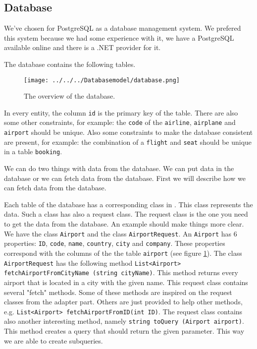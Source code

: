 
\subsection{Database}
We've chosen for PostgreSQL as a database management system. We prefered this system because we had some experience with it, we have a PostgreSQL available online and there is a .NET provider for it.

The database contains the following tables.
\begin{figure}[H]
	\centering
	\texttt{[image: ../../../Databasemodel/database.png]}
	\caption{The overview of the database.}
	\label{fig:database_design}
\end{figure}
In every entity, the column \texttt{id} is the primary key of the table. There are also some other constraints, for example: the \texttt{code} of the \texttt{airline}, \texttt{airplane} and \texttt{airport} should be unique. Also some constraints to make the database consistent are present, for example: the combination of a \texttt{flight} and \texttt{seat} should be unique in a table \texttt{booking}. 

We can do two things with data from the database. We can put data in the database or we can fetch data from the database. First we will describe how we can fetch data from the database.

Each table of the database has a corresponding class in \Csh. This class represents the  data. Such a class has also a request class. The request class is the one you need to get the data from the database. An example should make things more clear. We have the class \texttt{Airport} and the class \texttt{AirportRequest}. An \texttt{Airport} has 6 properties: \texttt{ID}, \texttt{code}, \texttt{name}, \texttt{country}, \texttt{city} and  \texttt{company}. These properties correspond with the columns of the the table \texttt{airport} (see figure \ref{fig:database_design}). The class \texttt{AirportRequest} has the following method \texttt{List<Airport> fetchAirportFromCityName (string cityName)}. This method returns every airport that is located in a city with the given name. This request class contains several "fetch" methods. Some of these methods are inspired on the request classes from the adapter part. Others are just provided to help other methods, e.g. \texttt{List<Airport> fetchAirportFromID(int ID)}. The request class contains also another interesting method, namely \texttt{string toQuery (Airport airport)}. This method creates a query that should return the given parameter. This way we are able to create subqueries.

